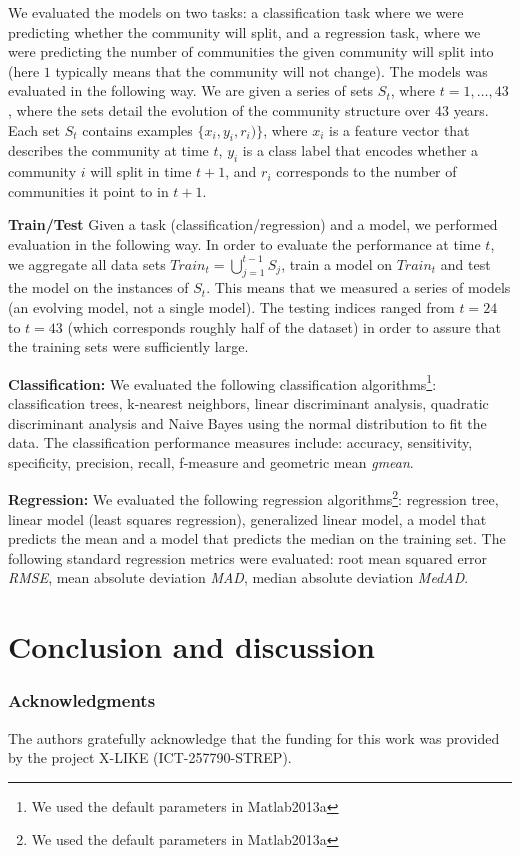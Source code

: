 \documentclass{article} %
\begin{document}
We evaluated the models on two tasks: a classification task where we
were predicting whether the community will split, and a regression
task, where we were predicting
the number of communities the given community will split into (here
$1$ typically means that the community will not change).
The models was evaluated in the following way. We are given a series
of sets $S_t$, where $t = 1,\ldots, 43$, where the sets detail the
evolution of the community structure over $43$ years. Each set $S_t$
contains examples $\{x_i, y_i, r_i)\}$, where $x_i$ is a feature
vector that describes the community at time $t$, $y_i$ is a class
label that encodes whether a community $i$ will split in time $t+1$,
and $r_i$ corresponds to the number of communities it point to in
$t+1$.

\textbf{Train/Test} Given a task (classification/regression) and a
model, we performed evaluation in the following way. In order to
evaluate the performance at time $t$, we aggregate
all data sets $Train_t = \bigcup_{j=1}^{t-1}{S_j}$, train a model on
$Train_t$ and test the model on the instances of $S_t$. This means
that we measured a series of models (an evolving model, not a single
model). The testing indices ranged from $t = 24$ to $t = 43$ (which
corresponds roughly half of the dataset) in order to assure that the
training sets were sufficiently large.

\textbf{Classification:}
We evaluated the following classification algorithms\footnote{We used
the default parameters in Matlab2013a}: classification trees,
k-nearest neighbors, linear discriminant analysis, quadratic
discriminant analysis and Naive Bayes using the normal distribution to
fit the data.
The classification performance measures include: accuracy,
sensitivity, specificity, precision, recall, f-measure and geometric
mean \emph{gmean}.

\textbf{Regression:} We evaluated the following regression
algorithms\footnote{We used the default parameters in Matlab2013a}:
regression tree, linear model (least squares regression), generalized
linear model, a model that predicts the mean and a model that predicts
the median on the training set.
The following standard regression metrics were evaluated: root mean
squared error \emph{RMSE}, mean absolute deviation \emph{MAD}, median
absolute deviation \emph{MedAD}.

\section{Conclusion and discussion}

\subsubsection*{Acknowledgments}
   The authors gratefully acknowledge that the funding for this work was provided by the project X-LIKE (ICT-257790-STREP)\cite{xlike}.




\end{document}
